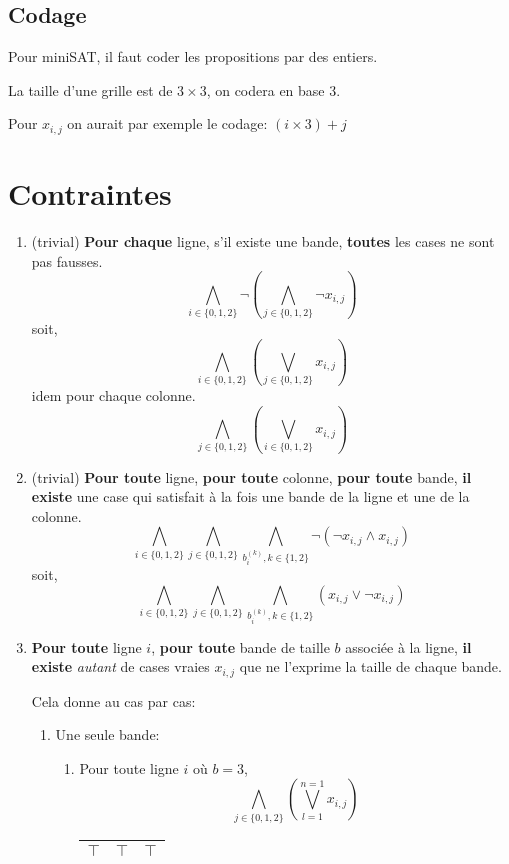 \documentclass[a4paper,12pt]{report}
\begin{document}
\subsection{Codage}
Pour miniSAT, il faut coder les propositions par des entiers.


La taille d'une grille est de $3\times3$, on codera en base 3.


Pour  $x_{i,j}$ on aurait par exemple le codage: $(i \times 3)+ j$


\section{Contraintes}
\begin{enumerate}

\item (trivial) \textbf{Pour chaque} ligne, s'il existe une bande, \textbf{toutes} les cases ne sont pas fausses.
$$ \bigwedge_{i \in \{0,1,2\}} \lnot \left( \bigwedge_{j \in \{0,1,2\}} \lnot x_{i,j} \right) $$
soit,
$$ \bigwedge_{i \in \{0,1,2\}} \left( \bigvee_{j \in \{0,1,2\}} x_{i,j} \right) $$
idem pour chaque colonne.
$$ \bigwedge_{j \in \{0,1,2\}} \left( \bigvee_{i \in \{0,1,2\}} x_{i,j} \right) $$

\item (trivial) \textbf{Pour toute} ligne, \textbf{pour toute} colonne, \textbf{pour toute} bande, \textbf{il existe} une case qui satisfait à la fois une bande de la ligne et une de la colonne.
$$\bigwedge_{i \in \{0,1,2\}} \bigwedge_{j \in \{0,1,2\}} \bigwedge_{b_i^{(k)}, k\in\{1,2\}} 
\lnot \left(
	\lnot x_{i,j} \wedge x_{i,j}
\right)$$
soit,
$$\bigwedge_{i \in \{0,1,2\}} \bigwedge_{j \in \{0,1,2\}} \bigwedge_{b_i^{(k)}, k\in\{1,2\}} 
\left(
	x_{i,j} \vee \lnot x_{i,j}
\right)$$

\item \textbf{Pour toute} ligne $i$, \textbf{pour toute} bande de taille $b$ associée à la ligne, \textbf{il existe} \textit{autant} de cases vraies $x_{i,j}$ que ne l'exprime la taille de chaque bande. 

Cela donne au cas par cas:
	\begin{enumerate}
		\item Une seule bande: 
		\begin{enumerate}
			\item Pour toute ligne $i$ où $b=3$, 
			$$\bigwedge_{j\in\{0,1,2\}}\left( \bigvee_{l=1}^{n=1} x_{i,j} \right)$$
			\begin{center}						
			\begin{tabular}{|c|c|c|}
			\hline 
			$\top$ & $\top$  & $\top$  \\ 
			\hline  
			\end{tabular}
			\end{center}


\end{enumerate}
\end{enumerate}
\end{enumerate}
\end{document}
